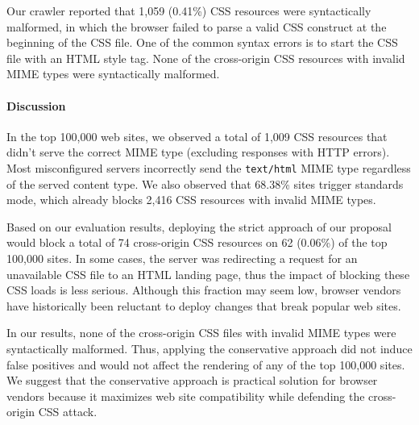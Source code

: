 \documentclass{acm_proc_article-sp}
\begin{document}
Our crawler reported that 1,059 (0.41\%) CSS resources were syntactically malformed, in which the browser failed to parse a valid CSS construct at the beginning of the CSS file. One of the common syntax errors is to start the CSS file with an HTML style tag. None of the cross-origin CSS resources with invalid MIME types were syntactically malformed.


\paragraph{Discussion}
In the top 100,000 web sites, we observed a total of 1,009 CSS resources that didn't serve the correct MIME type (excluding responses with HTTP errors). Most misconfigured servers incorrectly send the \texttt{text/html} MIME type regardless of the served content type. We also observed that 68.38\% sites trigger standards mode, which already blocks 2,416 CSS resources with invalid MIME types.

Based on our evaluation results, deploying the strict approach of our proposal would block a total of 74 cross-origin CSS resources on 62 (0.06\%) of the top 100,000 sites. In some cases, the server was redirecting a request for an unavailable CSS file to an HTML landing page, thus the impact of blocking these CSS loads is less serious. Although this fraction may seem low, browser vendors have historically been reluctant to deploy changes that break popular web sites. 

In our results, none of the cross-origin CSS files with invalid MIME types were syntactically malformed. Thus, applying the conservative approach did not induce false positives and would not affect the rendering of any of the top 100,000 sites. We suggest that the conservative approach is practical solution for browser vendors because it maximizes web site compatibility while defending the cross-origin CSS attack.
\end{document}
